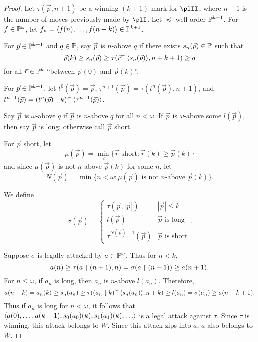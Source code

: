 \documentclass[11pt]{article}
\theoremstyle{plain}
\theoremstyle{definition}
\theoremstyle{remark}
\theoremstyle{plain}
\theoremstyle{definition}
\theoremstyle{remark}
\begin{document}
  \begin{proof}
    Let \(\tau(\vec p,n+1)\) be a winning \((k+1)\)-mark for \(\plII\),
    where \(n+1\) is the number of moves previously made by \(\plI\).
    Let \(\preceq\) well-order \(\mathbb{P}^{k+1}\).
    For \(f\in\mathbb{P}^\omega\), let
    \(f_n=\langle f(n),\dots,f(n+k)\rangle\in\mathbb{P}^{k+1}\).

    For \(\vec p\in \mathbb{P}^{k+1}\) and \(q\in\mathbb{P}\), say \(\vec p\) is
    \(n\)-above \(q\) if there exists \(s_n(\vec p)\in\mathbb{P}\)
    such that
    \[
      \vec p(k)
    \geq
      s_n(\vec p)
    \geq
      \tau(\vec r{^\frown}\langle s_n(\vec p)\rangle,n+k+1)
    \geq
      q
    \]
    for all \(\vec r\in\mathbb{P}^k\) ``between \(\vec p(0)\) and \(\vec p(k)\)''.

    For \(\vec p\in\mathbb{P}^{k+1}\), let \(t^0(\vec p)=\vec p\),
    \(\tau^{n+1}(\vec p)=\tau(t^n(\vec p),n+1)\), and
    \(t^{n+1}(\vec p)=(t^n(\vec p)\downharpoonright k){^\frown}\langle\tau^{n+1}(\vec p)\rangle\).

    Say \(\vec p\) is \(\omega\)-above \(q\) if \(\vec p\) is \(n\)-above
    \(q\) for all \(n<\omega\). If \(\vec p\) is \(\omega\)-above some
    \(l(\vec p)\), then say \(\vec p\) is long; otherwise call \(\vec p\)
    short.

    For \(\vec p\) short, let
    \[
      \mu(\vec p)
        =
      \min_{\preceq}\{
        \vec r\text{ short}
          :
        \vec{r}(k)\geq\vec{p}(k)
      \}
    \]
    and since \(\mu(\vec p)\) is not \(n\)-above \(\vec p(k)\) for some \(n\),
    let
    \[
      N(\vec p)
        =
      \min\{
        n<\omega
      :
        \mu(\vec p)\text{ is not }n\text{-above }\vec p(k)
      \}
    .\]

    We define
    \[
      \sigma(\vec p)
        =
      \begin{cases}
        \tau(\vec p,|\vec p|) & |\vec p|\leq k \\
        l(\vec p) & \vec p \text{ is long} \\
        \tau^{N(\vec p)+1}(\vec p) & \vec p \text{ is short}
     \end{cases}
    .\]

    Suppose \(\sigma\) is legally attacked by \(a\in\mathbb{P}^\omega\).
    Thus for \(n<k\),
    \[
      a(n)
        \geq
      \tau(a\restriction(n+1),n)
        =
      \sigma(a\restriction(n+1))
        \geq
      a(n+1)
    .\]
    For \(n\leq\omega\), if \(a_n\) is long, then \(a_n\) is \(n\)-above
    \(l(a_n)\). Therefore,
    \[
      a(n+k)
        =
      a_n(k)
        \geq
      s_n(a_n)
        \geq
      \tau((a_n\downharpoonright k){^\frown}\langle s_n(a_n)\rangle,n+k)
        \geq
      l(a_n)
        =
      \sigma(a_n)
        \geq
      a(n+k+1)
    .\]
    Thus if \(a_n\) is long for \(n<\omega\), it follows that  \(\<a(0),\dots,a(k-1),s_0(a_0)(k),s_1(a_1)(k),\dots\>\)
    is a legal attack against \(\tau\). Since \(\tau\) is winning,
    this attack belongs to \(W\). Since this attack zips into \(a\),
    \(a\) also belongs to \(W\).


\end{proof}
\end{document}
